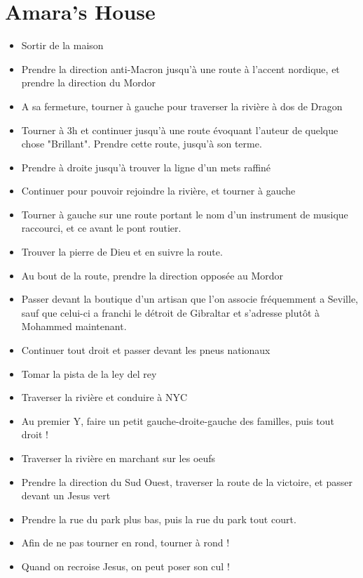 \documentclass[12pt]{article}
\begin{document}
  \justify %

\section{Amara's House}

\begin{itemize}
  \item Sortir de la maison
  \item Prendre la direction anti-Macron jusqu'à une route à l'accent nordique, et prendre la direction du Mordor
  \item A sa fermeture, tourner à gauche pour traverser la rivière à dos de Dragon
  \item Tourner à 3h et continuer jusqu'à une route évoquant l'auteur de quelque chose "Brillant". Prendre cette route, jusqu'à son terme.
  \item Prendre à droite jusqu'à trouver la ligne d'un mets raffiné 
  \item Continuer pour pouvoir rejoindre la rivière, et tourner à gauche
  \item Tourner à gauche sur une route portant le nom d'un instrument de musique raccourci, et ce avant le pont routier.
  \item Trouver la pierre de Dieu et en suivre la route.
  \item Au bout de la route, prendre la direction opposée au Mordor
  \item Passer devant la boutique d'un artisan que l'on associe fréquemment a Seville, sauf que celui-ci a franchi le détroit de Gibraltar et s'adresse plutôt à Mohammed maintenant. 
  \item Continuer tout droit et passer devant les pneus nationaux
  \item Tomar la pista de la ley del rey
  \item Traverser la rivière et conduire à NYC
  \item Au premier Y, faire un petit gauche-droite-gauche des familles, puis tout droit !
  \item Traverser la rivière en marchant sur les oeufs
  \item Prendre la direction du Sud Ouest, traverser la route de la victoire, et passer devant un Jesus vert
  \item Prendre la rue du park plus bas, puis la rue du park tout court.
  \item Afin de ne pas tourner en rond, tourner à rond !
  \item Quand on recroise Jesus, on peut poser son cul !
\end{itemize}
\end{document}
